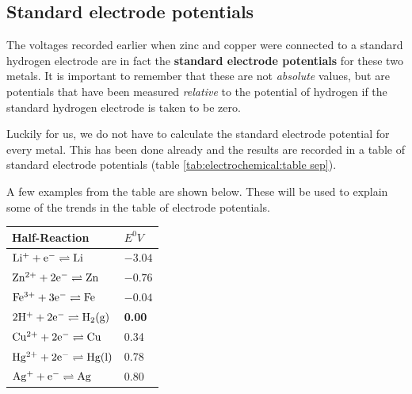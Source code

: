 \subsection{Standard electrode potentials}
\label{subsec:electrochemical:standard potentials}

The voltages recorded earlier when zinc and copper were connected to a standard hydrogen electrode are in fact the \textbf{standard electrode potentials} for these two metals. It is important to remember that these are not \textit{absolute} values, but are potentials that have been measured \textit{relative} to the potential of hydrogen if the standard hydrogen electrode is taken to be zero. 


Luckily for us, we do not have to calculate the standard electrode potential for every metal. This has been done already and the results are recorded in a table of standard electrode potentials (table \ref{tab:electrochemical:table sep}).

A few examples from the table are shown below. These will be used to explain some of the trends in the table of electrode potentials.
\begin{center}
\begin{tabular}{|l|l|}\hline 
\textbf{Half-Reaction}
&
\textbf{$E^{0}V$} \\ \hline\hline
$\rm{Li^{+} + e^{-} \rightleftharpoons Li}$ & $-3.04$ \\ \hline
$\rm{Zn^{2+} + 2e^{-} \rightleftharpoons Zn }$& $-0.76$ \\ \hline
$\rm{Fe^{3+} + 3e^{-} \rightleftharpoons Fe} $& $-0.04$ \\ \hline
$\rm{2H^{+} + 2e^{-} \rightleftharpoons H_{2} (g) }$& \textbf{0.00} \\ \hline
$\rm{Cu^{2+} + 2e^{-} \rightleftharpoons Cu }$& 0.34 \\ \hline
$\rm{Hg^{2+} + 2e^{-} \rightleftharpoons Hg (l) }$& 0.78 \\ \hline
$\rm{Ag^{+} + e^{-} \rightleftharpoons Ag }$& 0.80 \\ \hline
\end{tabular}
\end{center}

